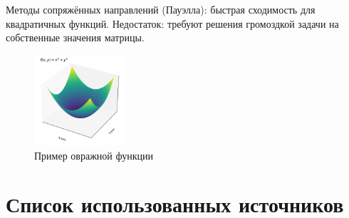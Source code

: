 Методы сопряжённых направлений (Пауэлла): быстрая сходимость для квадратичных функций. Недостаток: требуют решения громоздкой задачи на собственные значения матрицы.

\begin{figure}[H]
	\centering
	\includegraphics[width=0.3\textwidth, trim=0 0 0 0]{img/1-1.pdf}
	\caption{Пример овражной функции}
	\label{img:1-1}
\end{figure}

\section*{Список использованных источников}
\printbibliography[heading=none]